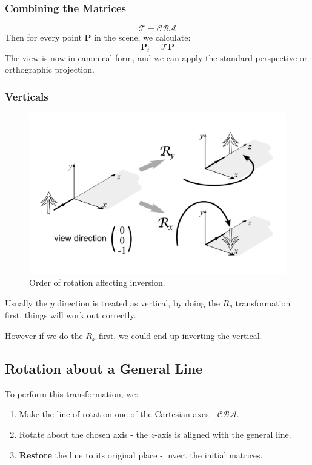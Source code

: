 \documentclass[11pt]{article}
\begin{document}
\subsubsection{Combining the Matrices}
\[
  \mathcal{T} = \mathcal{CBA}  
\]
Then for every point $\bm{P}$ in the scene, we calculate:
\[
  \bm{P}_t = \mathcal{T}\bm{P}  
\]
The view is now in canonical form, and we can apply the standard perspective or orthographic projection.

\subsubsection{Verticals}
\begin{figure}[htb!]
  \caption{Order of rotation affecting inversion.}
  \includegraphics[scale=0.2]{invert}
  \centering
\end{figure}

Usually the $y$ direction is treated as vertical, by doing the $R_y$ transformation first, things will work out correctly.

However if we do the $R_x$ first, we could end up inverting the vertical.

\subsection{Rotation about a General Line}
To perform this transformation, we:
\begin{enumerate}
  \item Make the line of rotation one of the Cartesian axes - $\mathcal{CBA}$.
  \item Rotate about the chosen axis - the $z$-axis is aligned with the general line.
  \item \textbf{Restore} the line to its original place - invert the initial matrices.
\end{enumerate}
\end{document}
